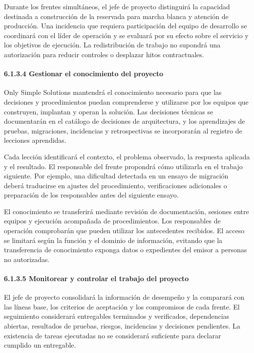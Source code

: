 \documentclass[11pt]{article}
\begin{document}
Durante los frentes simultáneos, el jefe de proyecto distinguirá la
capacidad destinada a construcción de la reservada para marcha blanca y
atención de producción. Una incidencia que requiera participación del
equipo de desarrollo se coordinará con el líder de operación y se
evaluará por su efecto sobre el servicio y los objetivos de ejecución.
La redistribución de trabajo no supondrá una autorización para reducir
controles o desplazar hitos contractuales.

\paragraph{6.1.3.4 Gestionar el conocimiento del proyecto}\label{6-1-3-4-gestionar-el-conocimiento-del-proyecto}

Only Simple Solutions mantendrá el conocimiento necesario para que las decisiones y procedimientos puedan comprenderse y utilizarse por los equipos que construyen, implantan y operan la solución. Las decisiones técnicas se documentarán en el catálogo de decisiones de arquitectura, y los aprendizajes de pruebas, migraciones, incidencias y retrospectivas se incorporarán al registro de lecciones aprendidas.

Cada lección identificará el contexto, el problema observado, la
respuesta aplicada y el resultado. El responsable del frente propondrá
cómo utilizarla en el trabajo siguiente. Por ejemplo, una dificultad
detectada en un ensayo de migración deberá traducirse en ajustes del
procedimiento, verificaciones adicionales o preparación de los
responsables antes del siguiente ensayo.

El conocimiento se transferirá mediante revisión de documentación,
sesiones entre equipos y ejecución acompañada de procedimientos. Los
responsables de operación comprobarán que pueden utilizar los
antecedentes recibidos. El acceso se limitará según la función y el
dominio de información, evitando que la transferencia de conocimiento
exponga datos o expedientes del emisor a personas no autorizadas.

\paragraph{6.1.3.5 Monitorear y controlar el trabajo del proyecto}\label{6-1-3-5-monitorear-y-controlar-el-trabajo-del-proyecto}

El jefe de proyecto consolidará la información de desempeño y la comparará con las líneas base, los criterios de aceptación y los compromisos de cada frente. El seguimiento considerará entregables terminados y verificados, dependencias abiertas, resultados de pruebas, riesgos, incidencias y decisiones pendientes. La existencia de tareas ejecutadas no se considerará suficiente para declarar cumplido un entregable.
\end{document}
